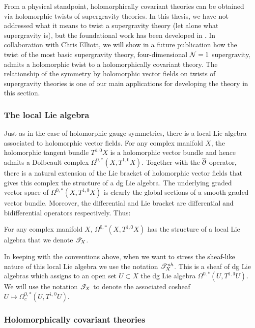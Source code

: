 From a physical standpoint, holomorphically covariant theories can be obtained via holomorphic twists of supergravity theories.
In this thesis, we have not addressed what it means to twist a supergravity theory (let alone what supergravity is), but the foundational work has been developed in \cite{CostelloLiSUGRA}. 
In collaboration with Chris Elliott, we will show in a future publication how the twist of the most basic supergravity theory, four-dimensional $\mathcal N = 1$ supergravity, admits a holomorphic twist to a holomorphically covariant theory. 
The relationship of the symmetry by holomorphic vector fields on twists of supergravity theories is one of our main applications for developing the theory in this section.

\subsubsection{The local Lie algebra}

Just as in the case of holomorphic gauge symmetries, there is a local Lie algebra associated to holomorphic vector fields. 
For any complex manifold $X$, the holomorphic tangent bundle $T^{1,0}X$ is a holomorphic vector bundle and hence admits a Dolbeault complex $\Omega^{0,*}(X, T^{1,0}X)$.
Together with the $\overline{\partial}$ operator, there is a natural extension of the Lie bracket of holomorphic vector fields that gives this complex the structure of a dg Lie algebra.
The underlying graded vector space of $\Omega^{0,*}(X, T^{1,0}X)$ is clearly the global sections of a smooth graded vector bundle.
Moreover, the differential and Lie bracket are differential and bidifferential operators respectively. 
Thus:

\begin{dfn/lem} 
For any complex manifold $X$, $\Omega^{0,*}(X, T^{1,0}X)$ has the structure of a local Lie algebra that we denote $\mathscr T_X$.
\end{dfn/lem}

In keeping with the conventions above, when we want to stress the sheaf-like nature of this local Lie algebra we use the notation $\mathscr T^{sh}_X$. 
This is a sheaf of dg Lie algebras which assigns to an open set $U \subset X$ the dg Lie algebra $\Omega^{0,*}(U, T^{1,0}U)$. 
We will use the notation $\mathscr T_X$ to denote the associated cosheaf $U \mapsto \Omega^{0,*}_c(U, T^{1,0}U)$.

\subsubsection{Holomorphically covariant theories}

